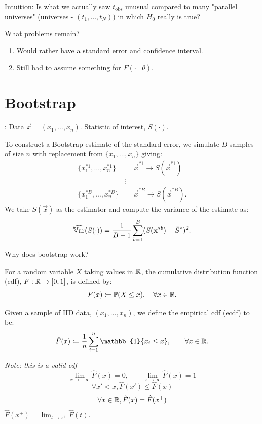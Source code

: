 \documentclass[10pt, a4paper]{article}
\begin{document}
Intuition:
Is what we actually saw $t_{\text{obs}}$ unusual compared to many
"parallel universes"
(universes -
$(t_1, \dotsc, t_N)$)
in which $H_0$ really is true?

What problems remain?
\begin{enumerate}[label = (\arabic*)]
    \item Would rather have a standard error and confidence interval.

    \item Still had to assume something for $F(\cdot\mid \theta)$.
\end{enumerate}

\newpage

\section{Bootstrap}:
Data $\vec{x} = (x_1, \dotsc, x_n)$.
Statistic of interest,
$S(\cdot)$.

To construct a Bootstrap estimate of the standard error,
we simulate $B$ samples of size $n$ with replacement from $\{x_1, \dotsc, x_n\}$ giving:
\begin{align*}
    \{x_1 ^ {*1}, \dotsc, x_n ^ {*1}\} &= \vec{x} ^ {*1} \to S(\vec{x} ^ {*1}) \\
    &\vdots \\
    \{x_1 ^ {*B}, \dotsc, x_n ^ {*B}\} &= \vec{x} ^ {*B} \to S(\vec{x} ^ {*B}).
\end{align*}
We take $S(\vec{x})$ as the estimator and compute the variance of the estimate as:
\[
\widehat{\mathbb{V}\mathrm{ar}}(S(\cdot)) = \frac{1}{B - 1}\sum_{b = 1}^{B}(S(\mathbf{x} ^ {*b}) - \bar{S} ^ {*}) ^ 2.
\]

Why does bootstrap work?

\begin{definition}
    For a random variable $X$ taking values in $\mathbb{R}$,
    the cumulative distribution function
    (cdf),
    $F : \mathbb{R} \to [0, 1]$,
    is defined by:
    \[
    F(x) \coloneqq \mathbb{P}(X \leq x),\quad \forall x \in \mathbb{R}.
    \]
\end{definition}

\begin{definition}
    Given a sample of IID data,
    $(x_1, \dotsc, x_n)$,
    we define the empirical cdf
    (ecdf)
    to be:
    \[
    \hat{F}(x) \coloneqq \frac{1}{n}\sum_{i = 1}^{n}\mathbb{1}\{x_i \leq x\},\qquad \forall x \in \R.
    \]
\end{definition}

\textit{Note:
this is a valid cdf}
\[
\lim_{x \to -\infty}\hat{F}(x) = 0,\qquad \lim_{x \to \infty}\hat{F}(x) = 1
\]
\[
\forall x' < x, \hat{F}(x') \leq \hat{F}(x)
\]
\[
\forall x \in \mathbb{R}, \hat{F}(x) = \hat{F}(x ^ {+})
\]
$\hat{F}(x ^ {+}) = \lim_{t \to x ^ {+}}\hat{F}(t)$.
\end{document}
